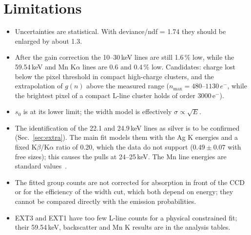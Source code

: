 \documentclass[11pt,a4paper]{article}
\begin{document}
\section{Limitations}
\begin{itemize}
\item Uncertainties are statistical. With deviance/ndf = 1.74 they should be enlarged by about 1.3.
\item After the gain correction the 10--30\,keV lines are still 1.6\,\% low, while the 59.54\,keV and Mn K$\alpha$
lines are 0.6 and 0.4\,\% low. Candidates: charge lost below the pixel threshold in compact high-charge clusters, and
the extrapolation of $g(n)$ above the measured range ($n_\mathrm{max} = 480$--$1130\,e^-$, while the brightest pixel
of a compact L-line cluster holds of order 3000\,e$^-$).
\item $s_0$ is at its lower limit; the width model is effectively $\sigma\propto\sqrt{E}$.
\item The identification of the 22.1 and 24.9\,keV lines as silver is to be confirmed (Sec.~\ref{sec:extra}). The
main fit models them with the Ag K energies and a fixed K$\beta$/K$\alpha$ ratio of 0.20, which the data do not support ($0.49\pm0.07$ with
free sizes); this causes the pulls at 24--25\,keV. The Mn line energies are standard values~\cite{xdb}.
\item The fitted group counts are not corrected for absorption in front of the CCD or for the efficiency of the width
cut, which both depend on energy; they cannot be compared directly with the emission probabilities.
\item EXT3 and EXT1 have too few L-line counts for a physical constrained fit; their 59.54\,keV, backscatter and
Mn K results are in the analysis tables.
\end{itemize}

\end{document}
